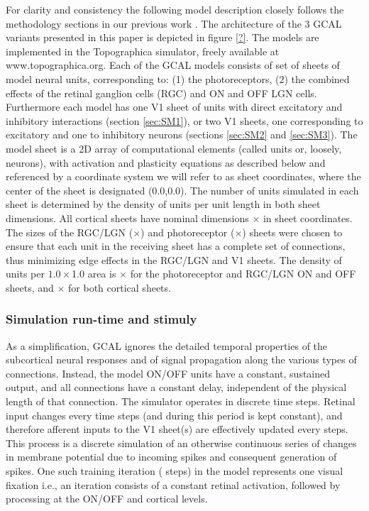 \documentclass[a4paper,10pt]{article}
\begin{document}
For clarity and consistency the following model description closely follows the methodology sections in our 
previous work \cite{Stevens2013,Antolik2011}. The architecture of the 3 GCAL variants presented in this 
paper is depicted in figure \ref{?}. The models are implemented in the Topographica simulator, freely available at www.topographica.org. 
Each of the GCAL models consists of set of sheets of model neural units,
corresponding to: (1) the photoreceptors, (2) the combined effects of the retinal ganglion cells (RGC) and ON and OFF LGN cells.
Furthermore each model has one V1 sheet of units with direct excitatory and inhibitory interactions (section \ref{sec:SM1}), or two 
V1 sheets, one corresponding to excitatory and one to inhibitory neurons (sections \ref{sec:SM2} and \ref{sec:SM3}).
The model sheet is a 2D array of computational elements (called units or, loosely, neurons), with activation and plasticity equations as 
described below and referenced by a coordinate system we will refer to as sheet coordinates, where the center of the sheet is designated (0.0,0.0).  
The number of units simulated in each sheet is determined by the density of units per unit length in both sheet dimensions. 
All cortical sheets have nominal dimensions $\times$ in sheet coordinates. The sizes of the
RGC/LGN ($\times$) and photoreceptor ($\times$) sheets
were chosen to ensure that each unit in the receiving sheet has a complete set of connections, thus minimizing edge effects in the
RGC/LGN and V1 sheets. The density of units per $1.0\times$1.0 area is $\times$ 
for the photoreceptor and RGC/LGN ON and OFF sheets, and $\times$ for both cortical sheets.

\subsubsection{Simulation run-time and stimuly}

As a simplification, GCAL ignores the detailed temporal properties of the subcortical neural responses and of signal propagation along the various types of connections. Instead, the model ON/OFF units have a constant, sustained output, and all connections have a constant delay, independent of the physical length of that connection. The simulator operates in discrete time steps. Retinal input changes every  time steps (and during this period is kept constant), and therefore afferent inputs to the V1 sheet(s) are effectively updated every  steps. This process is a discrete simulation of an otherwise continuous series of changes in membrane potential due to incoming spikes and consequent generation of spikes. One such training iteration ( steps) in the model represents one visual fixation i.e., an iteration consists of a constant retinal activation, followed by processing at the ON/OFF and cortical levels.
\end{document}
